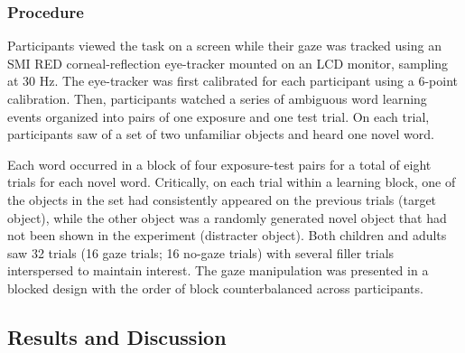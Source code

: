 \documentclass[oneside]{report}
\begin{document}
\subsubsection{Procedure}\label{procedure-3}

Participants viewed the task on a screen while their gaze was tracked
using an SMI RED corneal-reflection eye-tracker mounted on an LCD
monitor, sampling at 30 Hz. The eye-tracker was first calibrated for
each participant using a 6-point calibration. Then, participants watched
a series of ambiguous word learning events organized into pairs of one
exposure and one test trial. On each trial, participants saw of a set of
two unfamiliar objects and heard one novel word.

Each word occurred in a block of four exposure-test pairs for a total of
eight trials for each novel word. Critically, on each trial within a
learning block, one of the objects in the set had consistently appeared
on the previous trials (target object), while the other object was a
randomly generated novel object that had not been shown in the
experiment (distracter object). Both children and adults saw 32 trials
(16 gaze trials; 16 no-gaze trials) with several filler trials
interspersed to maintain interest. The gaze manipulation was presented
in a blocked design with the order of block counterbalanced across
participants.

\subsection{Results and Discussion}\label{results-and-discussion-7}
\end{document}
